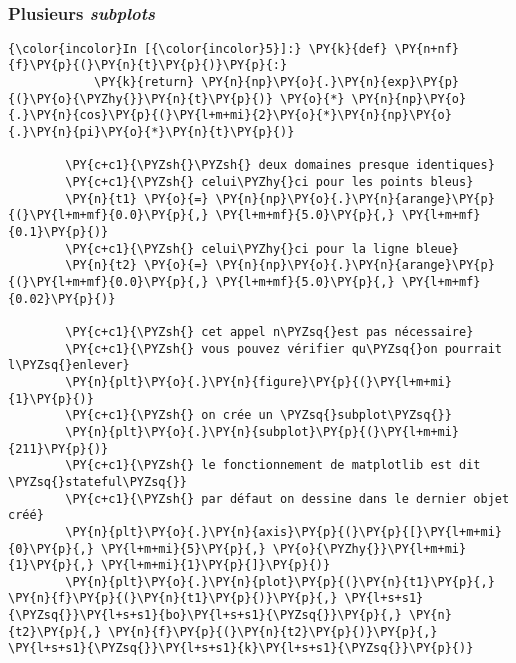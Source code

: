     \begin{center}
    \end{center}
    { \hspace*{\fill} \\}
    
    \hypertarget{plusieurs-subplots}{%
\subsubsection{\texorpdfstring{Plusieurs
\emph{subplots}}{Plusieurs subplots}}\label{plusieurs-subplots}}

    \begin{Verbatim}[commandchars=\\\{\}]
{\color{incolor}In [{\color{incolor}5}]:} \PY{k}{def} \PY{n+nf}{f}\PY{p}{(}\PY{n}{t}\PY{p}{)}\PY{p}{:}
            \PY{k}{return} \PY{n}{np}\PY{o}{.}\PY{n}{exp}\PY{p}{(}\PY{o}{\PYZhy{}}\PY{n}{t}\PY{p}{)} \PY{o}{*} \PY{n}{np}\PY{o}{.}\PY{n}{cos}\PY{p}{(}\PY{l+m+mi}{2}\PY{o}{*}\PY{n}{np}\PY{o}{.}\PY{n}{pi}\PY{o}{*}\PY{n}{t}\PY{p}{)}
        
        \PY{c+c1}{\PYZsh{}\PYZsh{} deux domaines presque identiques}
        \PY{c+c1}{\PYZsh{} celui\PYZhy{}ci pour les points bleus}
        \PY{n}{t1} \PY{o}{=} \PY{n}{np}\PY{o}{.}\PY{n}{arange}\PY{p}{(}\PY{l+m+mf}{0.0}\PY{p}{,} \PY{l+m+mf}{5.0}\PY{p}{,} \PY{l+m+mf}{0.1}\PY{p}{)}
        \PY{c+c1}{\PYZsh{} celui\PYZhy{}ci pour la ligne bleue}
        \PY{n}{t2} \PY{o}{=} \PY{n}{np}\PY{o}{.}\PY{n}{arange}\PY{p}{(}\PY{l+m+mf}{0.0}\PY{p}{,} \PY{l+m+mf}{5.0}\PY{p}{,} \PY{l+m+mf}{0.02}\PY{p}{)}
        
        \PY{c+c1}{\PYZsh{} cet appel n\PYZsq{}est pas nécessaire}
        \PY{c+c1}{\PYZsh{} vous pouvez vérifier qu\PYZsq{}on pourrait l\PYZsq{}enlever}
        \PY{n}{plt}\PY{o}{.}\PY{n}{figure}\PY{p}{(}\PY{l+m+mi}{1}\PY{p}{)}
        \PY{c+c1}{\PYZsh{} on crée un \PYZsq{}subplot\PYZsq{}}
        \PY{n}{plt}\PY{o}{.}\PY{n}{subplot}\PY{p}{(}\PY{l+m+mi}{211}\PY{p}{)}
        \PY{c+c1}{\PYZsh{} le fonctionnement de matplotlib est dit \PYZsq{}stateful\PYZsq{}}
        \PY{c+c1}{\PYZsh{} par défaut on dessine dans le dernier objet créé}
        \PY{n}{plt}\PY{o}{.}\PY{n}{axis}\PY{p}{(}\PY{p}{[}\PY{l+m+mi}{0}\PY{p}{,} \PY{l+m+mi}{5}\PY{p}{,} \PY{o}{\PYZhy{}}\PY{l+m+mi}{1}\PY{p}{,} \PY{l+m+mi}{1}\PY{p}{]}\PY{p}{)}
        \PY{n}{plt}\PY{o}{.}\PY{n}{plot}\PY{p}{(}\PY{n}{t1}\PY{p}{,} \PY{n}{f}\PY{p}{(}\PY{n}{t1}\PY{p}{)}\PY{p}{,} \PY{l+s+s1}{\PYZsq{}}\PY{l+s+s1}{bo}\PY{l+s+s1}{\PYZsq{}}\PY{p}{,} \PY{n}{t2}\PY{p}{,} \PY{n}{f}\PY{p}{(}\PY{n}{t2}\PY{p}{)}\PY{p}{,} \PY{l+s+s1}{\PYZsq{}}\PY{l+s+s1}{k}\PY{l+s+s1}{\PYZsq{}}\PY{p}{)}
        

\end{Verbatim}
